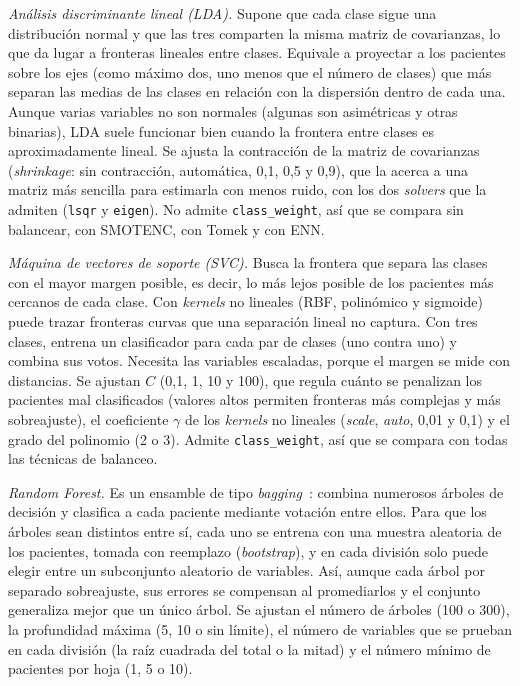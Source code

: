 \documentclass[journal,onecolumn]{IEEEtran}
\makeatletter
\def\subsubsection{\@startsection{subsubsection}{3}{\z@}{1.2ex plus 0.3ex minus
0.2ex}{0.4ex}{\normalfont\normalsize\itshape}}
\makeatother
\begin{document}
\textit{Análisis discriminante lineal (LDA).} Supone que cada clase sigue una distribución normal y
que las tres comparten la misma matriz de covarianzas, lo que da lugar a fronteras lineales entre
clases.
Equivale a proyectar a los pacientes sobre los ejes (como máximo dos, uno menos que el número de
clases) que más separan las medias de las clases en relación con la dispersión dentro de cada una.
Aunque varias variables no son normales (algunas son asimétricas y otras binarias), LDA suele
funcionar bien cuando la frontera entre clases es aproximadamente lineal.
Se ajusta la contracción de la matriz de covarianzas (\textit{shrinkage}: sin contracción,
automática, 0,1, 0,5 y 0,9), que la acerca a una matriz más sencilla para estimarla con menos ruido,
con los dos \textit{solvers} que la admiten (\texttt{lsqr} y \texttt{eigen}).
No admite \texttt{class\_weight}, así que se compara sin balancear, con SMOTENC, con Tomek y con ENN.

\textit{Máquina de vectores de soporte (SVC).} Busca la frontera que separa las clases con el mayor
margen posible, es decir, lo más lejos posible de los pacientes más cercanos de cada clase.
Con \textit{kernels} no lineales (RBF, polinómico y sigmoide) puede trazar fronteras curvas que una
separación lineal no captura.
Con tres clases, entrena un clasificador para cada par de clases (uno contra uno) y combina sus votos.
Necesita las variables escaladas, porque el margen se mide con distancias.
Se ajustan $C$ (0,1, 1, 10 y 100), que regula cuánto se penalizan los pacientes mal clasificados
(valores altos permiten fronteras más complejas y más sobreajuste), el coeficiente $\gamma$ de los
\textit{kernels} no lineales (\textit{scale}, \textit{auto}, 0,01 y 0,1) y el grado del polinomio
(2 o 3).
Admite \texttt{class\_weight}, así que se compara con todas las técnicas de balanceo.

\subsubsection{Modelos de ensamble}

\textit{Random Forest.} Es un ensamble de tipo \textit{bagging}~\cite{tema2,nb_ensambles}: combina
numerosos árboles de decisión y clasifica a cada paciente mediante votación entre ellos.
Para que los árboles sean distintos entre sí, cada uno se entrena con una muestra aleatoria de los
pacientes, tomada con reemplazo (\textit{bootstrap}), y en cada división solo puede elegir entre un
subconjunto aleatorio de variables.
Así, aunque cada árbol por separado sobreajuste, sus errores se compensan al promediarlos y el
conjunto generaliza mejor que un único árbol.
Se ajustan el número de árboles (100 o 300), la profundidad máxima (5, 10 o sin límite), el número
de variables que se prueban en cada división (la raíz cuadrada del total o la mitad) y el número
mínimo de pacientes por hoja (1, 5 o 10).
\end{document}
